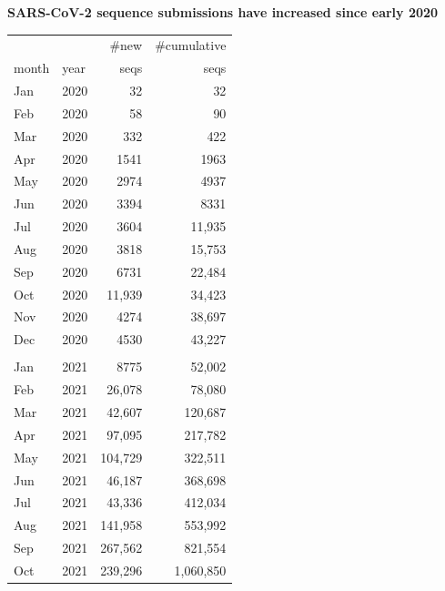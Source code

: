 \documentclass[landscape]{slides}
\begin{document}
\begin{slide}
\begin{center}
\normalsize{\textbf{SARS-CoV-2 sequence submissions have increased since early 2020}}
\end{center}

\tiny
\begin{center}
\begin{tabular}{llrr}
          &          &\#new     &\#cumulative\\
month     &year      &seqs      &seqs      \\ \hline
Jan       & 2020     &32        &32        \\ 
Feb       & 2020     &58        &90        \\ 
Mar       & 2020     &332       &422       \\ 
Apr       & 2020     &1541      &1963      \\ 
May       & 2020     &2974      &4937      \\ 
Jun       & 2020     &3394      &8331      \\ 
Jul       & 2020     &3604      &11,935    \\ 
Aug       & 2020     &3818      &15,753    \\ 
Sep       & 2020     &6731      &22,484    \\ 
Oct       & 2020     &11,939    &34,423    \\ 
Nov       & 2020     &4274      &38,697    \\ 
Dec       & 2020     &4530      &43,227    \\ 
& & & \\
Jan       & 2021     &8775      &52,002    \\ 
Feb       & 2021     &26,078    &78,080    \\ 
Mar       & 2021     &42,607    &120,687   \\ 
Apr       & 2021     &97,095    &217,782   \\ 
May       & 2021     &104,729   &322,511   \\ 
Jun       & 2021     &46,187    &368,698   \\ 
Jul       & 2021     &43,336    &412,034   \\ 
Aug       & 2021     &141,958   &553,992   \\ 
Sep       & 2021     &267,562   &821,554   \\ 
Oct       & 2021     &239,296   &1,060,850 \\ 

\end{tabular}
\end{center}
\end{slide}
\end{document}
